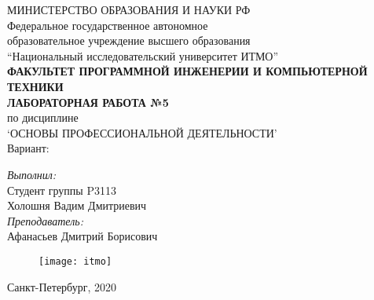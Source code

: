\begin{center}
МИНИСТЕРСТВО ОБРАЗОВАНИЯ И НАУКИ РФ\\
\hfill \break
Федеральное государственное автономное\\ 
образовательное учреждение высшего образования\\
``Национальный исследовательский университет ИТМО''\\
\hfill \break
\textbf{ФАКУЛЬТЕТ ПРОГРАММНОЙ ИНЖЕНЕРИИ И КОМПЬЮТЕРНОЙ ТЕХНИКИ}\\
\vspace{2.5cm}
\large{\textbf{ЛАБОРАТОРНАЯ РАБОТА №5}}\\
по дисциплине\\
\large{`ОСНОВЫ ПРОФЕССИОНАЛЬНОЙ ДЕЯТЕЛЬНОСТИ'}\\
\hfill \break
Вариант: \\
\end{center}

\vspace{8cm}
 
\begin{flushright}
\textit{Выполнил:}\\
Студент группы P3113\\
Холошня Вадим Дмитриевич\\
\textit{Преподаватель:}\\
Афанасьев Дмитрий Борисович\\
\end{flushright}
 
\vfill

\begin{figure}[H]
\centering
\texttt{[image: itmo]}
\end{figure}
\begin{center} Санкт-Петербург, 2020 \end{center}

\thispagestyle{empty}
\newpage
